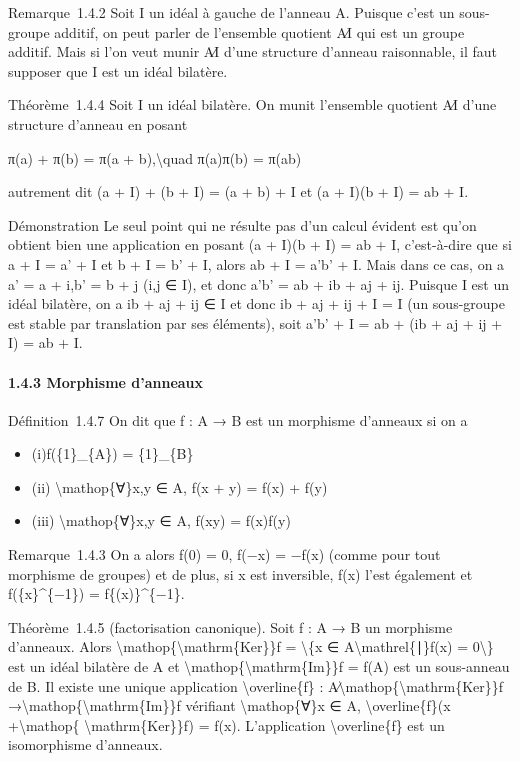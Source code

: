 \documentclass[]{article}
\begin{document}
Remarque~1.4.2 Soit I un idéal à gauche de l'anneau A. Puisque c'est un
sous-groupe additif, on peut parler de l'ensemble quotient A∕I qui est
un groupe additif. Mais si l'on veut munir A∕I d'une structure d'anneau
raisonnable, il faut supposer que I est un idéal bilatère.

Théorème~1.4.4 Soit I un idéal bilatère. On munit l'ensemble quotient
A∕I d'une structure d'anneau en posant

π(a) + π(b) = π(a + b),\textbackslash{}quad π(a)π(b) = π(ab)

autrement dit (a + I) + (b + I) = (a + b) + I et (a + I)(b + I) = ab +
I.

Démonstration Le seul point qui ne résulte pas d'un calcul évident est
qu'on obtient bien une application en posant (a + I)(b + I) = ab + I,
c'est-à-dire que si a + I = a' + I et b + I = b' + I, alors ab + I =
a'b' + I. Mais dans ce cas, on a a' = a + i,b' = b + j (i,j ∈ I), et
donc a'b' = ab + ib + aj + ij. Puisque I est un idéal bilatère, on a ib
+ aj + ij ∈ I et donc ib + aj + ij + I = I (un sous-groupe est stable
par translation par ses éléments), soit a'b' + I = ab + (ib + aj + ij +
I) = ab + I.

\paragraph{1.4.3 Morphisme d'anneaux}

Définition~1.4.7 On dit que f : A → B est un morphisme d'anneaux si on a

\begin{itemize}
\itemsep1pt\parskip0pt
\item
  (i)f(\{1\}\_\{A\}) = \{1\}\_\{B\}
\item
  (ii) \textbackslash{}mathop\{∀\}x,y ∈ A, f(x + y) = f(x) + f(y)
\item
  (iii) \textbackslash{}mathop\{∀\}x,y ∈ A, f(xy) = f(x)f(y)
\end{itemize}

Remarque~1.4.3 On a alors f(0) = 0, f(−x) = −f(x) (comme pour tout
morphisme de groupes) et de plus, si x est inversible, f(x) l'est
également et f(\{x\}\^{}\{−1\}) = f\{(x)\}\^{}\{−1\}.

Théorème~1.4.5 (factorisation canonique). Soit f : A → B un morphisme
d'anneaux. Alors
\textbackslash{}mathop\{\textbackslash{}mathrm\{Ker\}\}f =
\textbackslash{}\{x ∈ A\textbackslash{}mathrel\{∣\}f(x) =
0\textbackslash{}\} est un idéal bilatère de A et
\textbackslash{}mathop\{\textbackslash{}mathrm\{Im\}\}f = f(A) est un
sous-anneau de B. Il existe une unique application
\textbackslash{}overline\{f\} :
A∕\textbackslash{}mathop\{\textbackslash{}mathrm\{Ker\}\}f
→\textbackslash{}mathop\{\textbackslash{}mathrm\{Im\}\}f vérifiant
\textbackslash{}mathop\{∀\}x ∈ A, \textbackslash{}overline\{f\}(x
+\textbackslash{}mathop\{ \textbackslash{}mathrm\{Ker\}\}f) = f(x).
L'application \textbackslash{}overline\{f\} est un isomorphisme
d'anneaux.
\end{document}
